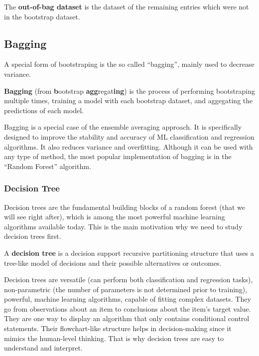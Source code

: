 The \textbf{out-of-bag dataset} is the dataset of the remaining entries which were not in the bootstrap dataset.
\ed


\subsection{Bagging}

A special form of bootstraping is the so called ``bagging'', mainly used to decrease variance.

\bd[Bagging]
\textbf{Bagging} (from \textbf{b}ootstrap \textbf{agg}regat\textbf{ing}) is the process of performing bootstraping
multiple times, training a model with each bootstrap dataset, and aggegating the predictions of each model.
\ed


Bagging is a special case of the ensemble averaging approach. It is specifically designed to improve the stability
and accuracy of ML classification and regression algorithms. It also reduces variance and overfitting. Although it can
be used with any type of method, the most popular implementation of bagging is in the ``Random Forest'' algorithm.

\subsubsection{Decision Tree}

Decision trees are the fundamental building blocks of a random forest (that we will see right after), which is among
the most powerful machine learning algorithms available today. This is the main motivation why we need to study decision
trees first.

A \textbf{decision tree} is a decision support recursive partitioning structure that uses a tree-like model of
decisions and their possible alternatives or outcomes.
\ed

Decision trees are versatile (can perform both classification and regression tasks), non-parametric (the number of
parameters is not determined prior to training), powerful, machine learning algorithms, capable of fitting complex
datasets. They go from observations about an item to conclusions about the item's target value. They are one way to
display an algorithm that only contains conditional control statements. Their flowchart-like structure helps in
decision-making since it mimics the human-level thinking. That is why decision trees are easy to understand and
interpret.

